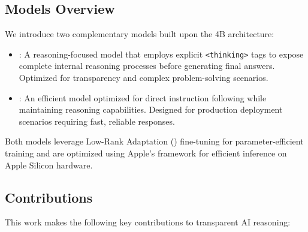 \subsection{Models Overview}

We introduce two complementary models built upon the \qwen{} 4B architecture:

\begin{itemize}
    \item \textbf{\supra{}}: A reasoning-focused model that employs explicit \texttt{<thinking>} tags to expose complete internal reasoning processes before generating final answers. Optimized for transparency and complex problem-solving scenarios.
    
    \item \textbf{\zennano{}}: An efficient model optimized for direct instruction following while maintaining reasoning capabilities. Designed for production deployment scenarios requiring fast, reliable responses.
\end{itemize}

Both models leverage Low-Rank Adaptation (\lora{}) fine-tuning \cite{hu2021lora} for parameter-efficient training and are optimized using Apple's \mlx{} framework for efficient inference on Apple Silicon hardware.

\subsection{Contributions}

This work makes the following key contributions to transparent AI reasoning:

